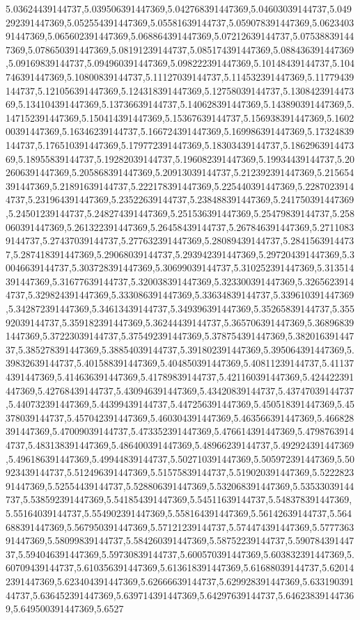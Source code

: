 5.03624439144737,5.039506391447369,5.042768391447369,5.04603039144737,5.049292391447369,5.052554391447369,5.05581639144737,5.059078391447369,5.062340391447369,5.065602391447369,5.068864391447369,5.07212639144737,5.075388391447369,5.078650391447369,5.08191239144737,5.085174391447369,5.088436391447369,5.09169839144737,5.094960391447369,5.098222391447369,5.10148439144737,5.104746391447369,5.10800839144737,5.11127039144737,5.114532391447369,5.11779439144737,5.121056391447369,5.124318391447369,5.12758039144737,5.130842391447369,5.134104391447369,5.13736639144737,5.140628391447369,5.143890391447369,5.147152391447369,5.150414391447369,5.15367639144737,5.156938391447369,5.160200391447369,5.16346239144737,5.166724391447369,5.169986391447369,5.17324839144737,5.176510391447369,5.179772391447369,5.18303439144737,5.186296391447369,5.18955839144737,5.19282039144737,5.196082391447369,5.19934439144737,5.202606391447369,5.205868391447369,5.20913039144737,5.212392391447369,5.215654391447369,5.21891639144737,5.222178391447369,5.225440391447369,5.22870239144737,5.231964391447369,5.23522639144737,5.238488391447369,5.241750391447369,5.24501239144737,5.248274391447369,5.251536391447369,5.25479839144737,5.258060391447369,5.261322391447369,5.26458439144737,5.267846391447369,5.27110839144737,5.27437039144737,5.277632391447369,5.28089439144737,5.28415639144737,5.287418391447369,5.29068039144737,5.293942391447369,5.297204391447369,5.30046639144737,5.303728391447369,5.30699039144737,5.310252391447369,5.313514391447369,5.31677639144737,5.320038391447369,5.323300391447369,5.32656239144737,5.329824391447369,5.333086391447369,5.33634839144737,5.339610391447369,5.342872391447369,5.34613439144737,5.349396391447369,5.35265839144737,5.35592039144737,5.359182391447369,5.36244439144737,5.365706391447369,5.368968391447369,5.37223039144737,5.375492391447369,5.378754391447369,5.38201639144737,5.385278391447369,5.38854039144737,5.391802391447369,5.395064391447369,5.39832639144737,5.401588391447369,5.404850391447369,5.40811239144737,5.411374391447369,5.414636391447369,5.41789839144737,5.421160391447369,5.424422391447369,5.42768439144737,5.430946391447369,5.43420839144737,5.43747039144737,5.440732391447369,5.44399439144737,5.447256391447369,5.450518391447369,5.45378039144737,5.457042391447369,5.460304391447369,5.463566391447369,5.466828391447369,5.47009039144737,5.473352391447369,5.476614391447369,5.47987639144737,5.483138391447369,5.486400391447369,5.48966239144737,5.492924391447369,5.496186391447369,5.49944839144737,5.502710391447369,5.505972391447369,5.50923439144737,5.512496391447369,5.51575839144737,5.519020391447369,5.522282391447369,5.52554439144737,5.528806391447369,5.532068391447369,5.53533039144737,5.538592391447369,5.541854391447369,5.54511639144737,5.548378391447369,5.55164039144737,5.554902391447369,5.558164391447369,5.56142639144737,5.564688391447369,5.567950391447369,5.57121239144737,5.574474391447369,5.577736391447369,5.58099839144737,5.584260391447369,5.58752239144737,5.59078439144737,5.594046391447369,5.59730839144737,5.600570391447369,5.603832391447369,5.60709439144737,5.610356391447369,5.613618391447369,5.61688039144737,5.620142391447369,5.623404391447369,5.62666639144737,5.629928391447369,5.63319039144737,5.636452391447369,5.639714391447369,5.64297639144737,5.646238391447369,5.649500391447369,5.6527